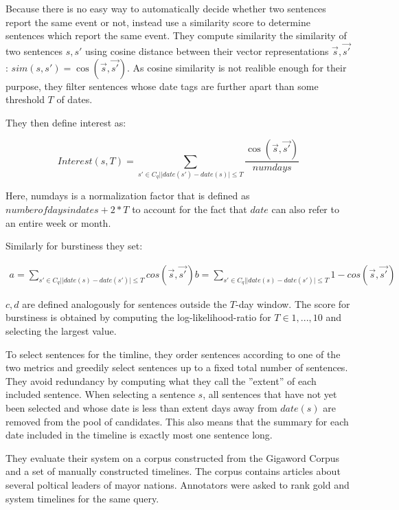 \documentclass[a4paper,BCOR=10mm]{report}
\numberwithin{lemma}{chapter}
\numberwithin{definition}{chapter}
\begin{document}
Because there is no easy way to automatically decide whether two sentences report the same event or not, \citeauthor{chieu} instead use a similarity score to determine sentences which report the same event. They compute similarity the similarity of two sentences $s, s'$ using cosine distance between their vector representations $\vec{s}, \vec{s'}$: $\mathit{sim}(s, s') = \cos(\vec{s}, \vec{s'})$.
As cosine similarity is not realible enough for their purpose, they filter sentences whose date tags are further apart than some threshold $T$ of dates.

They then define interest as:

\begin{equation}
\mathit{Interest}(s, T) = \sum_{s' \in C_q | |\mathit{date}(s') - \mathit{date}(s)| \leq T} \frac{\cos(\vec{s}, \vec{s'})}{\mathit{numdays}}
\end{equation}

Here, numdays is a normalization factor that is defined as $\mathit{number of days in dates} + 2 * T$ to account for the fact that $\mathit{date}$ can also refer to an entire week or month.

Similarly for burstiness they set:

\begin{align}
a = \sum_{s' \in C_q | |\mathit{date}(s) - \mathit{date}(s')| \leq T} \mathit{cos}(\vec{s}, \vec{s'})
b = \sum_{s' \in C_q | |\mathit{date}(s) - \mathit{date}(s')| \leq T} 1 - \mathit{cos}(\vec{s}, \vec{s'})
\end{align}

$c, d$ are defined analogously for sentences outside the $T$-day window. The score for burstiness is obtained by computing the log-likelihood-ratio for $T \in 1, ..., 10$ and selecting the largest value.

To select sentences for the timline, they order sentences according to one of the two metrics and greedily select sentences up to a fixed total number of sentences.
They avoid redundancy by computing what they call the ''extent'' of each included sentence. When selecting a sentence $s$, all sentences that have not yet been selected and whose date is less than extent days away from $\mathit{date}(s)$ are removed from the pool of candidates.
This also means that the summary for each date included in the timeline is exactly most one sentence long.

They evaluate their system on a corpus constructed from the Gigaword Corpus \citep{gigaword} and a set of manually constructed timelines. The corpus contains articles about several poltical leaders of mayor nations. Annotators were asked to rank gold and system timelines for the same query.
\end{document}
